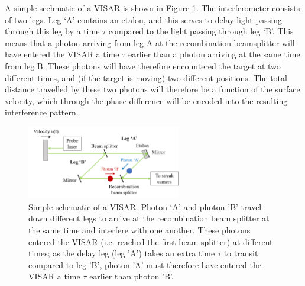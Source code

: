 A simple scehmatic of a VISAR is shown in Figure \ref{fig:VISAR_Schematic}. The interferometer consists of two legs. Leg `A' contains an etalon, and this serves to delay light passing through this leg by a time $\tau$ compared to the light passing through leg `B'. This means that a photon arriving from leg A at the recombination beamsplitter will have entered the VISAR a time $\tau$ earlier than a photon arriving at the same time from leg B. These photons will have therefore encountered the target at two different times, and (if the target is moving) two different positions. The total distance travelled by these two photons will therefore be a function of the surface velocity, which through the phase difference will be encoded into the resulting interference pattern.

\begin{figure}
\centering
\includegraphics[width=0.6\textwidth]{figures/Experiment/VISARSchematic.png}%
\caption{\label{fig:VISAR_Schematic} Simple schematic of a VISAR. Photon `A' and photon 'B' travel down different legs to arrive at the recombination beam splitter at the same time and interfere with one another. These photons entered the VISAR (i.e. reached the first beam splitter) at different times; as the delay leg (leg 'A') takes an extra time $\tau$ to transit compared to leg 'B', photon 'A' must therefore have entered the VISAR a time $\tau$ earlier than photon 'B'.}
\end{figure}

